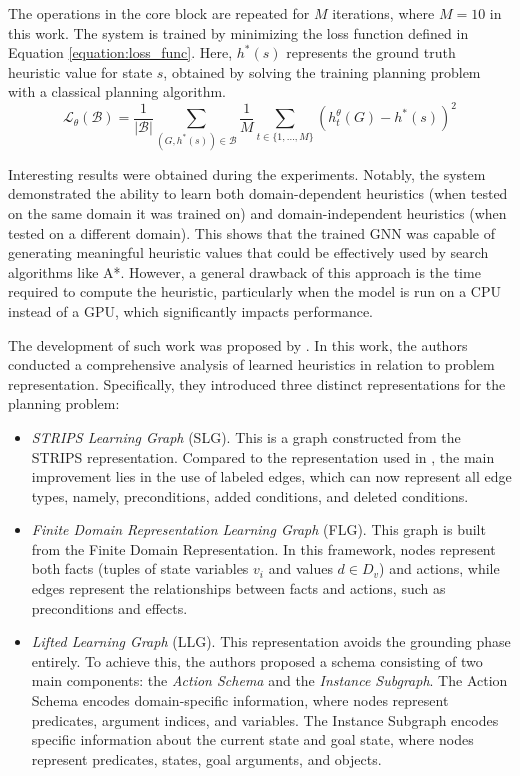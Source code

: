 The operations in the core block are repeated for $M$ iterations, where $M = 10$ in this work.
The system is trained by minimizing the loss function defined in Equation \ref{equation:loss_func}. Here, $h^{*}(s)$ represents the ground truth heuristic value for state $s$, obtained by solving the training planning problem with a classical planning algorithm.
\begin{equation}
    \mathcal{L}_\theta(\mathcal{B})=\frac{1}{|\mathcal{B}|} \sum_{\left(G, h^*(s)\right) \in \mathcal{B}} \frac{1}{M} \sum_{t \in \{1, \ldots, M\}}\left(h_t^\theta(G)-h^*(s)\right)^2
    \label{equation:loss_func}
\end{equation}

Interesting results were obtained during the experiments. Notably, the system demonstrated the ability to learn both domain-dependent heuristics (when tested on the same domain it was trained on) and domain-independent heuristics (when tested on a different domain). This shows that the trained GNN was capable of generating meaningful heuristic values that could be effectively used by search algorithms like A*. However, a general drawback of this approach is the time required to compute the heuristic, particularly when the model is run on a CPU instead of a GPU, which significantly impacts performance.

The development of such work was proposed by \cite{chen2024learning}. In this work, the authors conducted a comprehensive analysis of learned heuristics in relation to problem representation. Specifically, they introduced three distinct representations for the planning problem:

\begin{itemize}
    \item \textit{STRIPS Learning Graph} (SLG). This is a graph constructed from the STRIPS representation. Compared to the representation used in \cite{shen2020learning}, the main improvement lies in the use of labeled edges, which can now represent all edge types, namely, preconditions, added conditions, and deleted conditions.
    
    \item \textit{Finite Domain Representation Learning Graph} (FLG). This graph is built from the Finite Domain Representation. In this framework, nodes represent both facts (tuples of state variables $v_i$ and values $d \in D_v$) and actions, while edges represent the relationships between facts and actions, such as preconditions and effects.
    
    \item \textit{Lifted Learning Graph} (LLG). This representation avoids the grounding phase entirely. To achieve this, the authors proposed a schema consisting of two main components: the \textit{Action Schema} and the \textit{Instance Subgraph}. The Action Schema encodes domain-specific information, where nodes represent predicates, argument indices, and variables. The Instance Subgraph encodes specific information about the current state and goal state, where nodes represent predicates, states, goal arguments, and objects.
\end{itemize}

